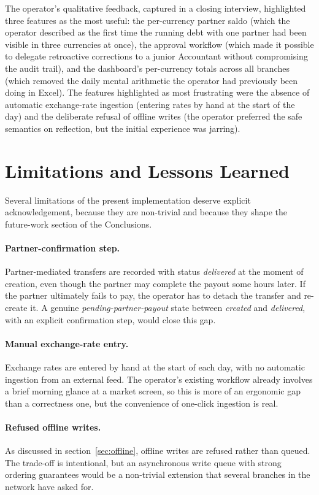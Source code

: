 The operator's qualitative feedback, captured in a closing interview, highlighted three features as the most useful: the per-currency partner saldo (which the operator described as the first time the running debt with one partner had been visible in three currencies at once), the approval workflow (which made it possible to delegate retroactive corrections to a junior Accountant without compromising the audit trail), and the dashboard's per-currency totals across all branches (which removed the daily mental arithmetic the operator had previously been doing in Excel). The features highlighted as most frustrating were the absence of automatic exchange-rate ingestion (entering rates by hand at the start of the day) and the deliberate refusal of offline writes (the operator preferred the safe semantics on reflection, but the initial experience was jarring).

\section{Limitations and Lessons Learned}
\label{sec:limits}

Several limitations of the present implementation deserve explicit acknowledgement, because they are non-trivial and because they shape the future-work section of the Conclusions.

\paragraph{Partner-confirmation step.}
Partner-mediated transfers are recorded with status \emph{delivered} at the moment of creation, even though the partner may complete the payout some hours later. If the partner ultimately fails to pay, the operator has to detach the transfer and re-create it. A genuine \emph{pending-partner-payout} state between \emph{created} and \emph{delivered}, with an explicit confirmation step, would close this gap.

\paragraph{Manual exchange-rate entry.}
Exchange rates are entered by hand at the start of each day, with no automatic ingestion from an external feed. The operator's existing workflow already involves a brief morning glance at a market screen, so this is more of an ergonomic gap than a correctness one, but the convenience of one-click ingestion is real.

\paragraph{Refused offline writes.}
As discussed in section~\ref{sec:offline}, offline writes are refused rather than queued. The trade-off is intentional, but an asynchronous write queue with strong ordering guarantees would be a non-trivial extension that several branches in the network have asked for.

